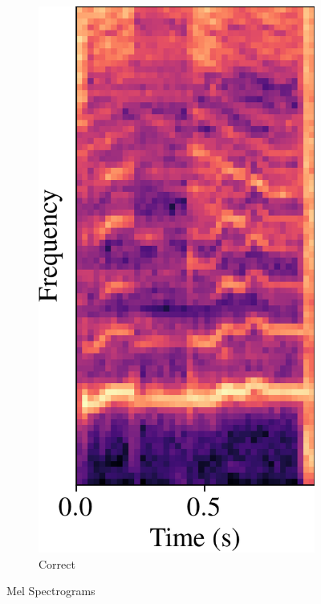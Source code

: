 \documentclass[conference]{IEEEtran}
\begin{document}
\begin{figure}[htbp]
\begin{subfigure}[b]{0.32\columnwidth}
    \end{subfigure}
    \hfill
    \begin{subfigure}[b]{0.32\columnwidth}
        \centerline{\includegraphics[width=\columnwidth]{spec_incorrect_2.png}}
        \caption{Correct}
        \label{spec_incorrect_2}
    \end{subfigure}
    \caption{Mel Spectrograms}
    \label{spectrograms}
\end{figure}
\end{document}
